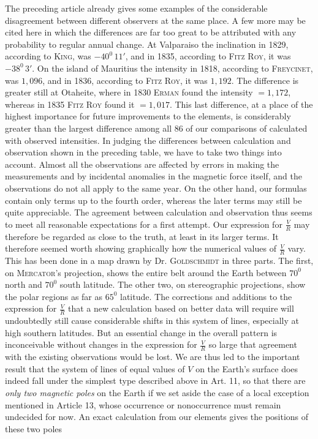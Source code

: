 \expandafter\def\csname HistoricalNoteText20\endcsname{The preceding article already gives some examples of the considerable disagreement between different observers at the same place. A few more may be cited here in which the differences are far too great to be attributed with any probability to regular annual change. At Valparaiso the inclination in 1829, according to \textsc{King}, was $-40^0\,11'$, and in 1835, according to \textsc{Fitz Roy}, it was $-38^0\,3'$. On the island of Mauritius the intensity in 1818, according to \textsc{Freycinet}, was $1{,}096$, and in 1836, according to \textsc{Fitz Roy}, it was $1{,}192$. The difference is greater still at Otaheite, where in 1830 \textsc{Erman} found the intensity $=1{,}172$, whereas in 1835 \textsc{Fitz Roy} found it $=1{,}017$. This last difference, at a place of the highest importance for future improvements to the elements, is considerably greater than the largest difference among all 86 of our comparisons of calculated with observed intensities.}
In judging the differences between calculation and observation shown in the preceding table, we have to take two things into account. Almost all the observations are affected by errors in making the measurements and by incidental anomalies in the magnetic force itself, and the observations do not all apply to the same year. On the other hand, our formulas contain only terms up to the fourth order, whereas the later terms may still be quite appreciable. The agreement between calculation and observation thus seems to meet all reasonable expectations for a first attempt. Our expression for $\frac VR$ may therefore be regarded as close to the truth, at least in its larger terms. It therefore seemed worth showing graphically how the numerical values of $\frac VR$ vary. This has been done in a map drawn by Dr. \textsc{Goldschmidt} in three parts. The first, on \textsc{Mercator}'s projection, shows the entire belt around the Earth between $70^0$ north and $70^0$ south latitude. The other two, on stereographic projections, show the polar regions as far as $65^0$ latitude. The corrections and additions to the expression for $\frac VR$ that a new calculation based on better data will require will undoubtedly still cause considerable shifts in this system of lines, especially at high southern latitudes. But an essential change in the overall pattern is inconceivable without changes in the expression for $\frac VR$ so large that agreement with the existing observations would be lost. We are thus led to the important result that the system of
lines of equal values of $V$ on the Earth's surface does indeed fall under the simplest type described above in Art. 11, so that there are \textit{only two magnetic poles} on the Earth if we set aside the case of a local exception mentioned in Article 13, whose occurrence or nonoccurrence must remain undecided for now. An exact calculation from our elements gives the positions of these two poles

